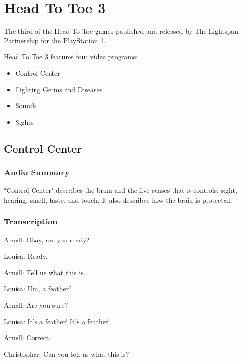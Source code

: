 \chapter{Head To Toe 3}


The third of the Head To Toe games published and released by The Lightspan Partnership for the PlayStation 1.

Head To Toe 3 features four video programs:

\begin{itemize}
    \item Control Center
    \item Fighting Germs and Diseases
    \item Sounds
    \item Sights
\end{itemize}

\clearpage
\newpage

\section{Control Center}

\subsection{Audio Summary}

"Control Center" describes the brain and the five senses that it controls: sight, hearing, smell, taste, and touch. It also describes how the brain is protected.

\subsection{Transcription}

Arnell: Okay, are you ready?

Louisa: Ready.

Arnell: Tell us what this is.

Louisa: Um, a feather?

Arnell: Are you sure?

Louisa: It's a feather! It's a feather!

Arnell: Correct.

Christopher: Can you tell us what this is?

